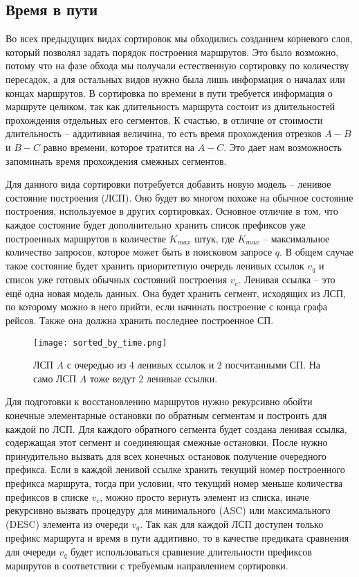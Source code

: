 \subsection{Время в пути}
Во всех предыдущих видах сортировок мы обходились созданием корневого слоя, который позволял задать порядок построения маршрутов. Это было возможно, потому что на фазе обхода мы получали естественную сортировку по количеству пересадок, а для остальных видов нужно была лишь информация о началах или концах маршрутов. В сортировка по времени в пути требуется информация о маршруте целиком, так как длительность маршрута состоит из длительностей прохождения отдельных его сегментов. К счастью, в отличие от стоимости длительность -- аддитивная величина, то есть время прохождения отрезков $A-B$ и $B-C$ равно времени, которое тратится на $A-C$. Это дает нам возможность запоминать время прохождения смежных сегментов.

Для данного вида сортировки потребуется добавить новую модель -- ленивое состояние построения (ЛСП). Оно будет во многом похоже на обычное состояние построения, используемое в других сортировках. Основное отличие в том, что каждое состояние будет дополнительно хранить список префиксов уже построенных маршрутов в количестве $K_{max}$ штук, где $K_{max}$ -- максимальное количество запросов, которое может быть в поисковом запросе $q$. В общем случае такое состояние будет хранить приоритетную очередь ленивых ссылок $v_q$ и список уже готовых обычных состояний построения $v_c$. Ленивая ссылка -- это ещё одна новая модель данных. Она будет хранить сегмент, исходящих из ЛСП, по которому можно в него прийти, если начинать построение с конца графа рейсов. Также она должна хранить последнее построенное СП.

\begin{figure}[!h]
	\centering
	\texttt{[image: sorted\_by\_time.png]}
	\caption{ЛСП $A$ с очередью из 4 ленивых ссылок и 2 посчитанными СП. На само ЛСП $A$ тоже ведут 2 ленивые ссылки.}\label{fig8}
\end{figure}

Для подготовки к восстановлению маршрутов нужно рекурсивно обойти конечные элементарные остановки по обратным сегментам и построить для каждой по ЛСП. Для каждого обратного сегмента будет создана ленивая ссылка, содержащая этот сегмент и соединяющая смежные остановки. После нужно принудительно вызвать для всех конечных остановок получение очередного префикса. Если в каждой ленивой ссылке хранить текущий номер построенного префикса маршрута, тогда при условии, что текущий номер меньше количества префиксов в списке $v_c$, можно просто вернуть элемент из списка, иначе рекурсивно вызвать процедуру для минимального (ASC) или максимального (DESC) элемента из очереди $v_q$. Так как для каждой ЛСП доступен только префикс маршрута и время в пути аддитивно, то в качестве предиката сравнения для очереди $v_q$ будет использоваться сравнение длительности префиксов маршрутов в соответствии с требуемым направлением сортировки.

